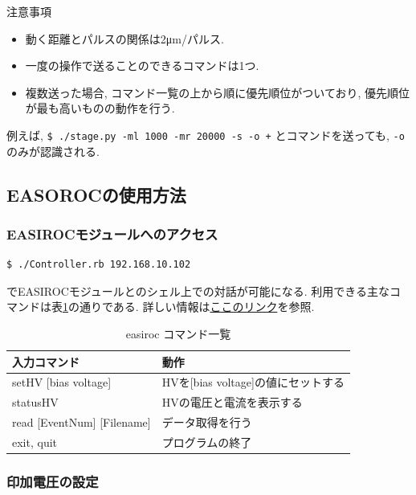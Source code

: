 \begin{itembox}[l]{注意事項}
  \begin{itemize}
    \item 動く距離とパルスの関係は2μm/パルス.
    \item 一度の操作で送ることのできるコマンドは1つ.
    \item 複数送った場合, コマンド一覧の上から順に優先順位がついており, 優先順位が最も高いものの動作を行う.
  \end{itemize}
  例えば, {\tt \$ ./stage.py -ml 1000 -mr 20000 -s -o +} とコマンドを送っても, {\tt -o} のみが認識される.
\end{itembox}


\subsection{EASOROCの使用方法}

\subsubsection{EASIROCモジュールへのアクセス}
\begin{lstlisting}
$ ./Controller.rb 192.168.10.102
\end{lstlisting}
でEASIROCモジュールとのシェル上での対話が可能になる.
利用できる主なコマンドは表\ref{table:easiroc_controller_commands}の通りである.
詳しい情報は\href{https://ppwww.phys.sci.kobe-u.ac.jp/~hamada/easiroc_manual.html}{ここのリンク}を参照.

\begin{table}[htbp]
  \begin{center}
    \caption{easiroc コマンド一覧}
    \label{table:easiroc_controller_commands}
    \begin{tabular}{|l|l|} \hline
      入力コマンド & 動作                                                     \\ \hline \hline
      setHV [bias voltage] & HVを[bias voltage]の値にセットする\\ \hline
      statusHV & HVの電圧と電流を表示する\\ \hline
      read [EventNum] [Filename] & データ取得を行う \\ \hline
      exit, quit & プログラムの終了\\ \hline
    \end{tabular}
  \end{center}
\end{table}

\subsubsection{印加電圧の設定}

